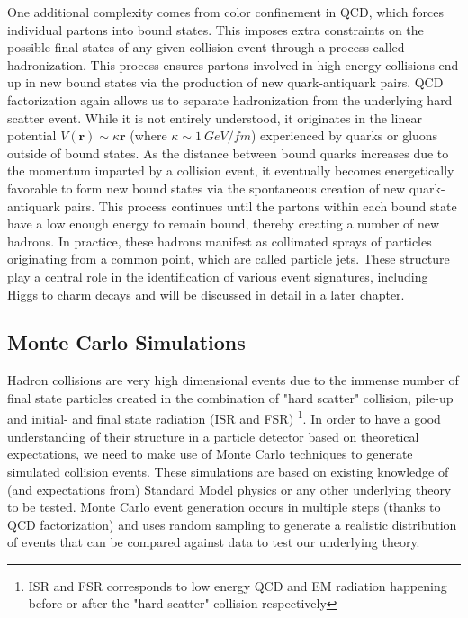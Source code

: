 One additional complexity comes from color confinement in QCD, which forces individual partons into bound states. 
This imposes extra constraints on the possible final states of any given collision event through a process called 
hadronization. This process ensures partons involved in high-energy collisions end up in new bound states via the 
production of new quark-antiquark pairs. QCD factorization again allows us to separate hadronization from the 
underlying hard scatter event. While it is not entirely understood, it originates in the linear potential 
$V(\mathbf{r}) \sim \kappa\mathbf{r}$ (where $\kappa \sim 1\ GeV/fm$) experienced by quarks or gluons outside 
of bound states. As the distance between bound quarks increases due to the momentum imparted by a collision 
event, it eventually becomes energetically favorable to form new bound states via the spontaneous creation of new 
quark-antiquark pairs. This process continues until the partons within each bound state have a low enough energy 
to remain bound, thereby creating a number of new hadrons. In practice, these hadrons manifest as collimated 
sprays of particles originating from a common point, which are called particle jets. These structure play a central role 
in the identification of various event signatures, including Higgs to charm decays and will be discussed in detail 
in a later chapter.

\subsection{Monte Carlo Simulations}

Hadron collisions are very high dimensional events due to the immense number of final state particles created 
in the combination of "hard scatter" collision, pile-up and initial- and final state radiation (ISR and FSR)
\footnote{ISR and FSR corresponds to low energy QCD and EM radiation happening before or after the "hard scatter" 
collision respectively}. In order to have a good understanding of their structure in a particle detector based on 
theoretical expectations, we need to make use of Monte Carlo techniques to generate simulated collision events. 
These simulations are based on existing knowledge of (and expectations from) Standard Model physics or any 
other underlying theory to be tested. Monte Carlo event generation occurs in multiple steps (thanks to QCD 
factorization) and uses random sampling to generate a realistic distribution of events that can be compared 
against data to test our underlying theory. \par

